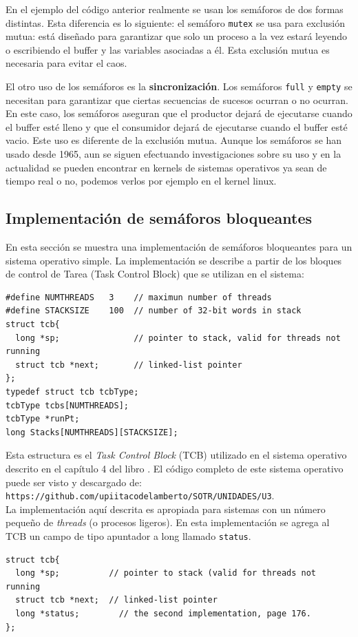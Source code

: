 \documentclass{article}
\begin{document}
En el ejemplo del c\'odigo anterior realmente se usan los sem\'aforos de dos formas 
distintas. Esta diferencia es lo siguiente: el sem\'aforo {\tt mutex} se usa para 
exclusi\'on mutua: est\'a dise\~nado para garantizar que solo un proceso a la vez estar\'a 
leyendo o escribiendo el buffer y las variables asociadas a \'el. Esta exclusi\'on mutua es 
necesaria para evitar el caos.

El otro uso de los sem\'aforos es la {\bf sincronizaci\'on}. Los sem\'aforos {\tt full} y 
{\tt empty} se necesitan para garantizar que ciertas secuencias de sucesos ocurran o no 
ocurran. En este caso, los sem\'aforos aseguran que el productor dejar\'a de ejecutarse 
cuando el buffer est\'e lleno y que el consumidor dejar\'a de ejecutarse cuando el buffer 
est\'e vacio. Este uso es diferente de la exclusi\'on mutua. Aunque los sem\'aforos se han 
usado desde 1965, aun se siguen efectuando investigaciones sobre su uso y en la actualidad 
se pueden encontrar en kernels de sistemas operativos ya sean de tiempo real o no, podemos 
verlos por ejemplo en el kernel linux.

\eject
\subsection{Implementaci\'on de sem\'aforos bloqueantes}
En esta secci\'on se muestra una implementaci\'on de sem\'aforos bloqueantes para un 
sistema operativo simple. La implementaci\'on se describe a partir de los bloques de 
control de Tarea (Task Control Block) que se utilizan en el sistema:
\begin{verbatim}
#define NUMTHREADS   3    // maximun number of threads
#define STACKSIZE    100  // number of 32-bit words in stack
struct tcb{
  long *sp;               // pointer to stack, valid for threads not running
  struct tcb *next;       // linked-list pointer
};
typedef struct tcb tcbType;
tcbType tcbs[NUMTHREADS];
tcbType *runPt;
long Stacks[NUMTHREADS][STACKSIZE];
\end{verbatim}
Esta estructura es el {\it Task Control Block} (TCB) utilizado en el sistema operativo 
descrito en el cap\'itulo 4 del libro \cite{Valvano}. El c\'odigo completo de este 
sistema operativo puede ser visto y descargado de:\\
{\tt https://github.com/upiitacodelamberto/SOTR/UNIDADES/U3}.\\
La implementaci\'on aqu\'i descrita es apropiada para sistemas con un 
n\'umero  peque\~no de {\it threads} (o procesos ligeros). En esta implementaci\'on 
se agrega al TCB un campo de tipo apuntador a long llamado {\tt status}. 
\begin{verbatim}
struct tcb{
  long *sp;          // pointer to stack (valid for threads not running
  struct tcb *next;  // linked-list pointer
  long *status;        // the second implementation, page 176.
};
\end{verbatim}
\end{document}
